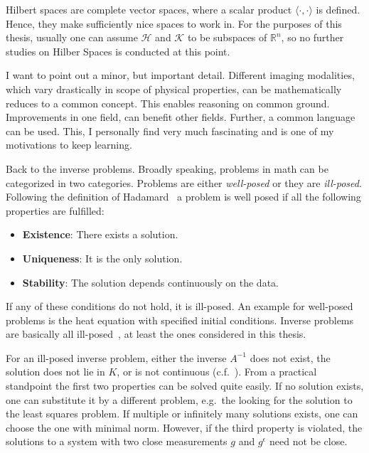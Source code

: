 Hilbert spaces are complete vector spaces, where a scalar product \(\langle\cdot,\cdot\rangle\) is
defined. Hence, they make sufficiently nice spaces to work in. For the purposes of this thesis,
usually one can assume \(\mathcal{H}\) and \(\mathcal{K}\) to be subspaces of \(\mathbb{R}^n\), so
no further studies on Hilber Spaces is conducted at this point.

I want to point out a minor, but important detail. Different imaging modalities, which vary
drastically in scope of physical properties, can be mathematically reduces to a common concept. This
enables reasoning on common ground. Improvements in one field, can benefit other fields. Further, a
common language can be used. This, I personally find very much fascinating and is one of my
motivations to keep learning.

Back to the inverse problems. Broadly speaking, problems in math can be categorized in two
categories. Problems are either \textit{well-posed} or they are \textit{ill-posed}. Following the
definition of Hadamard~\cite{hadamard_sur_1902} a problem is well posed if all the following
properties are fulfilled:

\begin{itemize}
	\item \textbf{Existence}: There exists a solution.
	\item \textbf{Uniqueness}: It is the only solution.
	\item \textbf{Stability}: The solution depends continuously on the data.
\end{itemize}

If any of these conditions do not hold, it is ill-posed. An example for well-posed problems is the
heat equation with specified initial conditions. Inverse problems are basically all
ill-posed~\cite{hansen_discrete_2010}, at least the ones considered in this thesis.

For an ill-posed inverse problem, either the inverse \(A^{-1}\) does not exist, the solution does
not lie in \(K\), or is not continuous (c.f.~\cite[Chapter~4]{natterer_mathematics_1986}). From a
practical standpoint the first two properties can be solved quite easily. If no solution exists, one
can substitute it by a different problem, e.g.\ the looking for the solution to the least squares
problem. If multiple or infinitely many solutions exists, one can choose the one with minimal norm.
However, if the third property is violated, the solutions to a system with two close measurements
\(g\) and \(g^\epsilon\) need not be close.

